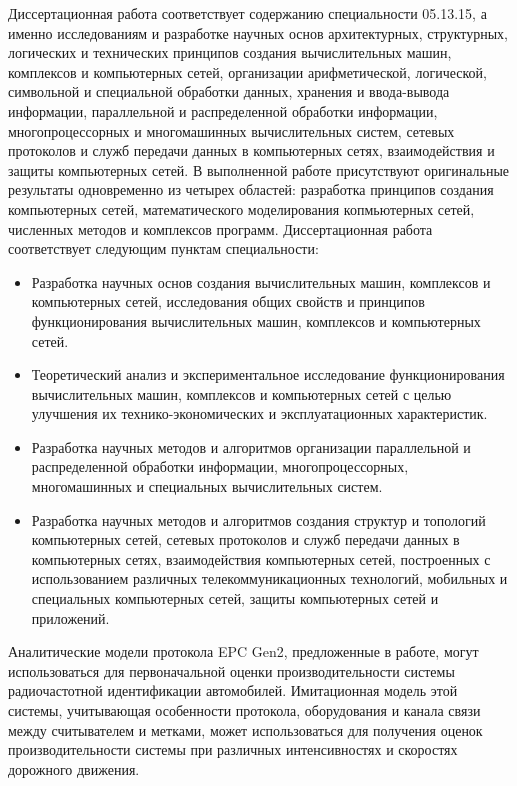 {\speciality}
Диссертационная работа соответствует содержанию специальности 05.13.15, а именно исследованиям и разработке научных основ архитектурных, структурных, логических и технических принципов создания вычислительных машин, комплексов и компьютерных сетей, организации арифметической, логической, символьной и специальной обработки данных, хранения и ввода-вывода информации, параллельной и распределенной обработки информации, многопроцессорных и многомашинных вычислительных систем, сетевых протоколов и служб передачи данных в компьютерных сетях, взаимодействия и защиты компьютерных сетей. В выполненной работе
присутствуют оригинальные результаты одновременно из четырех областей: разработка принципов создания компьютерных сетей, математического моделирования копмьютерных сетей, численных методов и комплексов программ. Диссертационная работа соответствует следующим пунктам специальности:
\begin{itemize}
    \item Разработка научных основ создания вычислительных машин, комплексов и компьютерных сетей, исследования общих свойств и принципов функционирования вычислительных машин, комплексов и компьютерных сетей.
    \item Теоретический анализ и экспериментальное исследование функционирования вычислительных машин, комплексов и компьютерных сетей с целью улучшения их технико-экономических и эксплуатационных характеристик.
    \item Разработка научных методов и алгоритмов организации параллельной и распределенной обработки информации, многопроцессорных, многомашинных и специальных вычислительных систем.
    \item Разработка научных методов и алгоритмов создания структур и топологий компьютерных сетей, сетевых протоколов и служб передачи данных в компьютерных сетях, взаимодействия компьютерных сетей, построенных с использованием различных телекоммуникационных технологий, мобильных и специальных компьютерных сетей, защиты компьютерных сетей и приложений.
\end{itemize}

{\influence}
Аналитические модели протокола EPC Gen2, предложенные в работе, могут использоваться для первоначальной оценки производительности системы радиочастотной идентификации автомобилей. Имитационная модель этой системы, учитывающая особенности протокола, оборудования и канала связи между считывателем и метками, может использоваться для получения оценок производительности системы при различных интенсивностях и скоростях дорожного движения.

